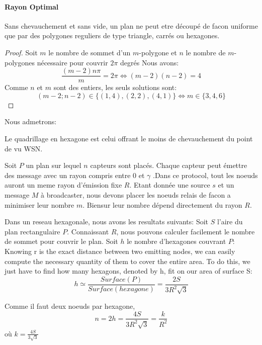 \paragraph{Rayon Optimal}


\begin{myth}
Sans chevauchement et sans vide, un plan ne peut etre découpé de facon uniforme que par des polygones reguliers de type triangle, carrés ou hexagones.
\end{myth}
\begin{proof}
 Soit $m$ le nombre de sommet d'un $m$-polygone et $n$ le nombre de $m$-polygones nécessaire pour couvrir $2\pi$ degrés
Nous avons: $$\frac{(m-2)n\pi}{m}=2\pi \Leftrightarrow (m-2)(n-2)=4$$
Comme $n$ et $m$ sont des entiers, les seuls solutions sont: $$(m-2;n-2)\in\{(1,4),(2,2),(4,1) \} \Leftrightarrow m \in \{ 3,4,6 \}$$
\end{proof}
Nous admetrons:
\begin{myth}
 Le quadrillage en hexagone est celui offrant le moins de chevauchement du point de vu WSN.
\end{myth}

Soit $P$ un plan sur lequel $n$ capteurs sont placés. Chaque capteur peut émettre des message avec un rayon compris entre 0 et $\gamma$ .Dans ce protocol, tout les noeuds auront un meme rayon d'émission fixe $R$.
Etant donnée une source $s$ et un message $M$ à broadcaster, nous devons placer les noeuds relais de facon a minimiser leur nombre $m$. Biensur leur nombre dépend directement du rayon $R$.
 

Dans un reseau hexagonale, nous avons les resultats suivants:
Soit $S$ l'aire du plan rectangulaire $P$. Connaissant $R$, nous pouvons calculer facilement le nombre de sommet pour couvrir le plan.
Soit $h$ le nombre d'hexagones couvrant $P$: 
Knowing r is the exact distance between two emitting
nodes, we can easily compute the necessary quantity of them
to cover the entire area. To do this, we just have to find how
many hexagons, denoted by h, fit on our area of surface S:
$$h \simeq \frac{Surface ( P)}{Surface(hexagone)}=\frac{2S}{3R^2 \sqrt{3}}$$

Comme il faut deux noeuds par hexagone,$$n=2h=\frac{4S}{3R^2 \sqrt{3}}= \frac{k}{R^2}$$ où $k=\frac{4S}{3 \sqrt{3}}$

